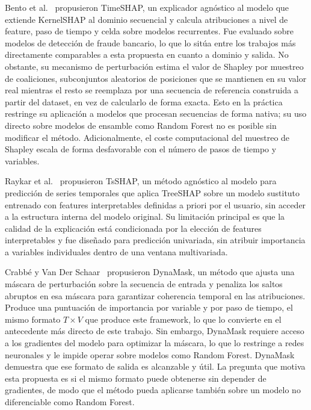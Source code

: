 \documentclass[conference, letterpaper]{IEEEtran}
\begin{document}
Bento et al.~\cite{bento2021} propusieron TimeSHAP, un explicador
agnóstico al modelo que extiende KernelSHAP al dominio secuencial y
calcula atribuciones a nivel de feature, paso de tiempo y celda sobre
modelos recurrentes. Fue evaluado sobre modelos de detección de fraude
bancario, lo que lo sitúa entre los trabajos más directamente
comparables a esta propuesta en cuanto a dominio y salida. No obstante,
su mecanismo de perturbación estima el valor de Shapley por muestreo
de coaliciones, subconjuntos aleatorios de posiciones que se
mantienen en su valor real mientras el resto se reemplaza por una
secuencia de referencia construida a partir del dataset, en vez de
calcularlo de forma exacta. Esto en la práctica restringe su
aplicación a modelos que procesan
secuencias de forma nativa; su uso directo sobre modelos de ensamble
como Random Forest no es posible sin modificar el método. Adicionalmente,
el coste computacional del muestreo de Shapley escala de forma
desfavorable con el número de pasos de tiempo y variables.

Raykar et al.~\cite{raykar2023} propusieron TsSHAP, un método
agnóstico al modelo para predicción de series temporales que aplica
TreeSHAP sobre un modelo sustituto entrenado con features
interpretables definidas a priori por el usuario, sin acceder a la
estructura interna del modelo original. Su limitación principal es
que la calidad de la explicación está condicionada por la elección de
features interpretables y fue diseñado para predicción univariada,
sin atribuir importancia a variables individuales dentro de una
ventana multivariada.

Crabbé y Van Der Schaar~\cite{crabbe2021} propusieron DynaMask, un método que ajusta una máscara de perturbación sobre la secuencia de entrada y penaliza los saltos abruptos en esa máscara para garantizar coherencia temporal en las atribuciones. Produce una puntuación de importancia por variable y por paso de tiempo, el mismo formato $T\times V$ que produce este framework, lo que lo convierte en el antecedente más directo de este trabajo. Sin embargo, DynaMask requiere acceso a los gradientes del modelo para optimizar la máscara, lo que lo restringe a redes neuronales y le impide operar sobre modelos como Random Forest. DynaMask demuestra que ese formato de salida es alcanzable y útil. La pregunta que motiva esta propuesta es si el mismo formato puede obtenerse sin depender de gradientes, de modo que el método pueda aplicarse también sobre un modelo no diferenciable como Random Forest.
\end{document}
